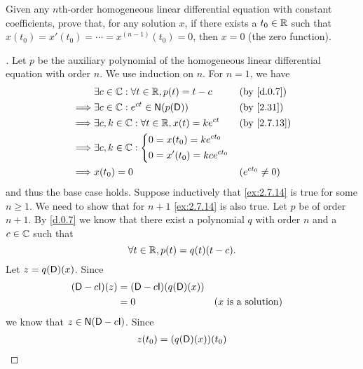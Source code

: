 \begin{ex}\label{ex:2.7.14}
  Given any \(n\)th-order homogeneous linear differential equation with constant coefficients, prove that, for any solution \(x\), if there exists a \(t_0 \in \mathbb{R}\) such that \(x(t_0) = x'(t_0) = \cdots = x^{(n - 1)}(t_0) = 0\), then \(x = 0\) (the zero function).
\end{ex}

\begin{proof}[]
  Let \(p\) be the auxiliary polynomial of the homogeneous linear differential equation with order \(n\).
  We use induction on \(n\).
  For \(n = 1\), we have
  \begin{align*}
             & \exists c \in \C : \forall t \in \R, p(t) = t - c       &  & \text{(by \cref{d.0.7})}  \\
    \implies & \exists c \in \C : e^{ct} \in \ns{p(\Dop)}              &  & \text{(by \cref{2.31})}   \\
    \implies & \exists c, k \in \C : \forall t \in \R, x(t) = k e^{ct} &  & \text{(by \cref{2.7.13})} \\
    \implies & \exists c, k \in \C : \begin{dcases}
                                       0 = x(t_0) = k e^{c t_0} \\
                                       0 = x'(t_0) = k c e^{c t_0}
                                     \end{dcases}                                       \\
    \implies & x(t_0) = 0                                              &  & (e^{c t_0} \neq 0)
  \end{align*}
  and thus the base case holds.
  Suppose inductively that \cref{ex:2.7.14} is true for some \(n \geq 1\).
  We need to show that for \(n + 1\) \cref{ex:2.7.14} is also true.
  Let \(p\) be of order \(n + 1\).
  By \cref{d.0.7} we know that there exist a polynomial \(q\) with order \(n\) and a \(c \in \mathbb{C}\) such that
  \[
    \forall t \in \mathbb{R}, p(t) = q(t) (t - c).
  \]
  Let \(z = q(\mathsf{D})(x)\).
  Since
  \begin{align*}
    (\Dop - c \IT)(z) & = (\Dop - c \IT)(q(\Dop)(x))                                   \\
                      & = 0                          &  & \text{(\(x\) is a solution)}
  \end{align*}
  we know that \(z \in \ns{\Dop - c \IT}\).
  Since
  \begin{align*}
    z(t_0) & = (q(\Dop)(x))(t_0)                                                  \\

\end{align*}
\end{proof}
